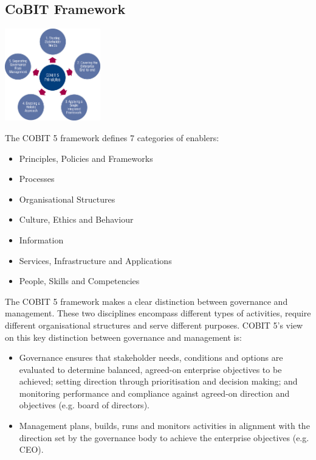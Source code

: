 \documentclass[8pt,a4]{extarticle}
\begin{document}
\begin{multicols}{3}
\section{CoBIT Framework}
\begin{center}
    \begin{minipage}[t][4cm][b]{4cm}
        \includegraphics[height=4cm]{cobit-fw.jpg}
    \end{minipage}
\end{center}
\noindent
The COBIT 5 framework defines
7 categories of enablers:
\begin{itemize}
    \item Principles, Policies and Frameworks
    \item Processes
    \item Organisational Structures
    \item Culture, Ethics and Behaviour
    \item Information
    \item Services, Infrastructure and Applications
    \item People, Skills and Competencies
\end{itemize}
\vspace{1em}
\noindent
The COBIT 5 framework makes a clear distinction between
governance and management. These two disciplines encompass
different types of activities, require different organisational structures
and serve different purposes. COBIT 5’s view on this key distinction
between governance and management is:

\begin{itemize}
    \item Governance ensures that stakeholder needs, conditions and options
    are evaluated to determine balanced, agreed-on enterprise objectives
    to be achieved; setting direction through prioritisation and decision
    making; and monitoring performance and compliance against
    agreed-on direction and objectives (e.g. board of directors).
    \item Management plans, builds, runs and monitors activities in alignment
    with the direction set by the governance body to achieve the
    enterprise objectives (e.g. CEO).
\end{itemize}


\end{multicols}
\end{document}
